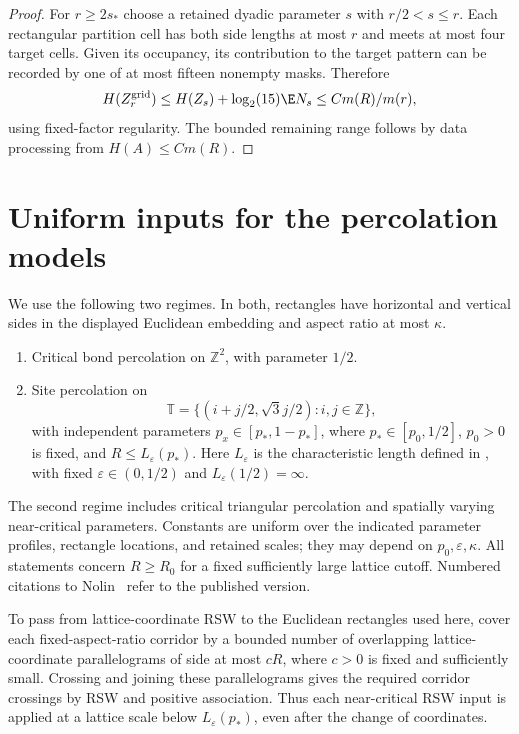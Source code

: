 \begin{proof}
For $r\ge2s_*$ choose a retained dyadic parameter $s$ with $r/2<s\le r$. Each rectangular partition cell has both side lengths at most $r$ and meets at most four target cells. Given its occupancy, its contribution to the target pattern can be recorded by one of at most fifteen nonempty masks. Therefore
\[
 H(Z_r^{\mathrm{grid}})\le H(Z_s)+\log_2(15)\E N_s
 \le C m(R)/m(r),
\]
using fixed-factor regularity. The bounded remaining range follows by data processing from $H(A)\le Cm(R)$.
\end{proof}

\section{Uniform inputs for the percolation models}\label{sec:inputs}

We use the following two regimes. In both, rectangles have horizontal and vertical sides in the displayed Euclidean embedding and aspect ratio at most $\kappa$.
\begin{enumerate}[label=(\roman*)]
\item Critical bond percolation on $\mathbb Z^2$, with parameter $1/2$.
\item Site percolation on
\[
 \mathbb T=\{(i+j/2,\sqrt3j/2):i,j\in\mathbb Z\},
\]
with independent parameters $p_x\in[p_*,1-p_*]$, where $p_*\in[p_0,1/2]$, $p_0>0$ is fixed, and $R\le L_\varepsilon(p_*)$. Here $L_\varepsilon$ is the characteristic length defined in \cite[Section~3.1]{Nolin}, with fixed $\varepsilon\in(0,1/2)$ and $L_\varepsilon(1/2)=\infty$.
\end{enumerate}
The second regime includes critical triangular percolation and spatially varying near-critical parameters. Constants are uniform over the indicated parameter profiles, rectangle locations, and retained scales; they may depend on $p_0,\varepsilon,\kappa$. All statements concern $R\ge R_0$ for a fixed sufficiently large lattice cutoff. Numbered citations to Nolin~\cite{Nolin} refer to the published version.

To pass from lattice-coordinate RSW to the Euclidean rectangles used here, cover each fixed-aspect-ratio corridor by a bounded number of overlapping lattice-coordinate parallelograms of side at most $cR$, where $c>0$ is fixed and sufficiently small. Crossing and joining these parallelograms gives the required corridor crossings by RSW and positive association. Thus each near-critical RSW input is applied at a lattice scale below $L_\varepsilon(p_*)$, even after the change of coordinates.

